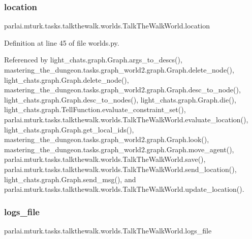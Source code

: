 \subsubsection{\texorpdfstring{location}{location}}
{\footnotesize\ttfamily parlai.\+mturk.\+tasks.\+talkthewalk.\+worlds.\+Talk\+The\+Walk\+World.\+location}



Definition at line 45 of file worlds.\+py.



Referenced by light\+\_\+chats.\+graph.\+Graph.\+args\+\_\+to\+\_\+descs(), mastering\+\_\+the\+\_\+dungeon.\+tasks.\+graph\+\_\+world2.\+graph.\+Graph.\+delete\+\_\+node(), light\+\_\+chats.\+graph.\+Graph.\+delete\+\_\+node(), mastering\+\_\+the\+\_\+dungeon.\+tasks.\+graph\+\_\+world2.\+graph.\+Graph.\+desc\+\_\+to\+\_\+node(), light\+\_\+chats.\+graph.\+Graph.\+desc\+\_\+to\+\_\+nodes(), light\+\_\+chats.\+graph.\+Graph.\+die(), light\+\_\+chats.\+graph.\+Tell\+Function.\+evaluate\+\_\+constraint\+\_\+set(), parlai.\+mturk.\+tasks.\+talkthewalk.\+worlds.\+Talk\+The\+Walk\+World.\+evaluate\+\_\+location(), light\+\_\+chats.\+graph.\+Graph.\+get\+\_\+local\+\_\+ids(), mastering\+\_\+the\+\_\+dungeon.\+tasks.\+graph\+\_\+world2.\+graph.\+Graph.\+look(), mastering\+\_\+the\+\_\+dungeon.\+tasks.\+graph\+\_\+world2.\+graph.\+Graph.\+move\+\_\+agent(), parlai.\+mturk.\+tasks.\+talkthewalk.\+worlds.\+Talk\+The\+Walk\+World.\+save(), parlai.\+mturk.\+tasks.\+talkthewalk.\+worlds.\+Talk\+The\+Walk\+World.\+send\+\_\+location(), light\+\_\+chats.\+graph.\+Graph.\+send\+\_\+msg(), and parlai.\+mturk.\+tasks.\+talkthewalk.\+worlds.\+Talk\+The\+Walk\+World.\+update\+\_\+location().

\mbox{\label{classparlai_1_1mturk_1_1tasks_1_1talkthewalk_1_1worlds_1_1TalkTheWalkWorld_a9916a385afde47632e7700c59aa5d847}} 
\subsubsection{\texorpdfstring{logs\+\_\+file}{logs\_file}}
{\footnotesize\ttfamily parlai.\+mturk.\+tasks.\+talkthewalk.\+worlds.\+Talk\+The\+Walk\+World.\+logs\+\_\+file}



